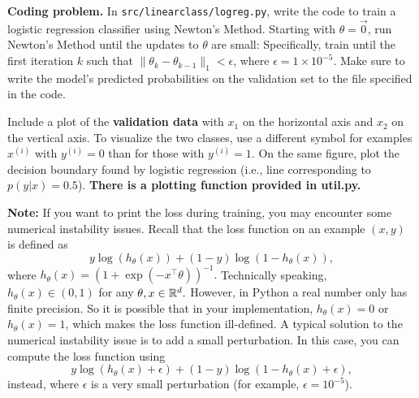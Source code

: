 \item {} \textbf{Coding problem.}
In \texttt{src/linearclass/logreg.py}, write the code to train a
logistic regression classifier using Newton's Method.
Starting with $\theta = \vec{0}$, run Newton's Method until the updates to
$\theta$ are small: Specifically, train until the first iteration $k$ such
that $\|\theta_{k} - \theta_{k-1}\|_1 < \epsilon$, where
$\epsilon = 1\times 10^{-5}$. Make sure to write the model's predicted probabilities on
the validation set to the file specified in the code.

Include a plot of the \textbf{validation data} with $x_1$ on the horizontal axis and $x_2$ on the vertical axis.
To visualize the two classes, use a different symbol for examples $x^{(i)}$
with $y^{(i)} = 0$ than for those with $y^{(i)} = 1$. On the same figure, plot the decision boundary
found by logistic regression (i.e., line corresponding to $p(y|x) = 0.5$). \textbf{There is a plotting function provided in util.py.}

\textbf{Note:} If you want to print the loss during training, you may encounter some numerical instability issues. Recall that the loss function on an example $(x,y)$ is defined as
$$y\log(h_{\theta}(x)) +  (1 - y)\log(1 - h_{\theta}(x)),$$
where $h_\theta(x)=(1+\exp(-x^\top \theta))^{-1}.$ Technically speaking, $h_{\theta}(x)\in(0,1)$ for any $\theta,x\in\mathbb{R}^{d}.$ However, in Python a real number only has finite precision. So it is possible that in your implementation, $h_{\theta}(x)=0$ or $h_{\theta}(x)=1$, which makes the loss function ill-defined. A typical solution to the numerical instability issue is to add a small perturbation. In this case, you can compute the loss function using 
$$y\log(h_{\theta}(x) + \epsilon) +  (1 - y)\log(1 - h_{\theta}(x) + \epsilon),$$
instead, where $\epsilon$ is a very small perturbation (for example, $\epsilon=10^{-5}$).

